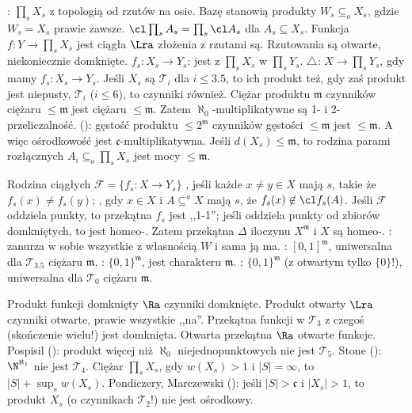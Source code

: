 :  $\prod_s X_s$ z topologią od rzutów na osie.
Bazę stanowią produkty $W_s \subseteq_o X_s$, gdzie $W_s = X_s$ prawie zawsze.
$\cl \prod_s A_s = \prod_s \cl A_s$ dla $A_s \subseteq X_s$.
Funkcja $f \colon Y \to \prod_s X_s$ jest ciągła $\Lra$ złożenia z rzutami są.
Rzutowania są otwarte, niekoniecznie domknięte.
 $f_s \colon X_s \to Y_s$: jest z $\prod_s X_s$ w $\prod_s Y_s$.
 $\triangle$: $X \to \prod_s Y_s$, gdy mamy $f_s \colon X_s \to Y_s$.
Jeśli $X_s$ są $\mathcal T_i$ dla $i \le 3.5$, to ich produkt też, gdy zaś produkt jest niepusty, $\mathcal T_i$ ($i \le 6$), to czynniki również.
Ciężar produktu $\mathfrak m$ czynników ciężaru $\le \mathfrak m$ jest ciężaru $\le \mathfrak m$.
Zatem $\aleph_0$-multiplikatywne są 1- i 2-przeliczalność.
 (): gęstość produktu $\le 2^{\mathfrak m}$ czynników gęstości $\le \mathfrak m$ jest $\le \mathfrak m$.
A więc ośrodkowość jest $\mathfrak c$-multiplikatywna.
Jeśli $d(X_s) \le \mathfrak m$, to rodzina parami rozłącznych $A_i \subseteq_o \prod_s X_s$ jest mocy $\le \mathfrak m$.

Rodzina ciągłych $\mathcal F = \{f_s \colon X \to Y_s\}$ , jeśli każde $x \neq y \in X$ mają $s$, takie że $f_s(x) \neq f_s(y)$; , gdy $x \in X$ i $A \subseteq^a X$ mają $s$, że $f_s(x) \not \in \cl f_s(A)$.
Jeśli $\mathcal F$ oddziela punkty, to przekątna $f_s$ jest ,,1-1''; jeśli oddziela punkty od zbiorów domkniętych, to jest homeo-.
Zatem przekątna $\Delta$ iloczynu $X^{\mathfrak m}$ i $X$ są homeo-.
: zanurza w sobie wszystkie z własnością $W$ i sama ją ma.
: $[0,1]^{\mathfrak m}$, uniwersalna dla $\mathcal T_{3.5}$ ciężaru $\mathfrak m$.
: $\{0,1\}^{\mathfrak m}$, jest charakteru $\mathfrak m$.
: $\{0,1\}^{\mathfrak m}$ (z otwartym tylko $\{0\}$!), uniwersalna dla $\mathcal T_0$ ciężaru $\mathfrak m$.

Produkt funkcji domknięty $\Ra$ czynniki domknięte.
Produkt otwarty $\Lra$ czynniki otwarte, prawie wszystkie ,,na''.
Przekątna funkcji w $\mathcal T_3$ z czegoś (skończenie wielu!) jest domknięta.
Otwarta przekątna $\Ra$ otwarte funkcje.
Pospisil (): produkt więcej niż $\aleph_0$ niejednopunktowych nie jest $\mathcal T_5$.
Stone (): $\N^{\aleph_1}$ nie jest $\mathcal T_4$.
Ciężar $\prod_s X_s$, gdy $w(X_s) > 1$ i $|S| = \infty$, to $|S| + \sup_s w(X_s)$. 
Pondiczery, Marczewski (): jeśli $|S| > \mathfrak c$ i $|X_s| > 1$, to produkt $X_s$ (o czynnikach $\mathcal T_2$!) nie jest ośrodkowy.
 
